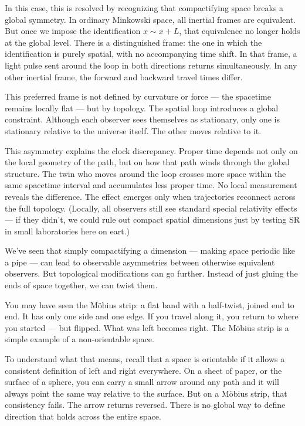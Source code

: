 In this case, this is resolved by recognizing that compactifying space breaks a global symmetry. In ordinary Minkowski space, all inertial frames are equivalent. But once we impose the identification $x \sim x + L$, that equivalence no longer holds at the global level. There is a distinguished frame: the one in which the identification is purely spatial, with no accompanying time shift. In that frame, a light pulse sent around the loop in both directions returns simultaneously. In any other inertial frame, the forward and backward travel times differ.

This preferred frame is not defined by curvature or force — the spacetime remains locally flat — but by topology. The spatial loop introduces a global constraint. Although each observer sees themselves as stationary, only one is stationary relative to the universe itself. The other moves relative to it.

This asymmetry explains the clock discrepancy. Proper time depends not only on the local geometry of the path, but on how that path winds through the global structure. The twin who moves around the loop crosses more space within the same spacetime interval and accumulates less proper time. No local measurement reveals the difference. The effect emerges only when trajectories reconnect across the full topology. (Locally, all observers still see standard special relativity effects — if they didn't, we could rule out compact spatial dimensions just by testing SR in small laboratories here on eart.)

We've seen that simply compactifying a dimension — making space periodic like a pipe — can lead to observable asymmetries between otherwise equivalent observers. But topological modifications can go further. Instead of just gluing the ends of space together, we can twist them.

You may have seen the Möbius strip: a flat band with a half-twist, joined end to end. It has only one side and one edge. If you travel along it, you return to where you started — but flipped. What was left becomes right. The Möbius strip is a simple example of a non-orientable space.

To understand what that means, recall that a space is orientable if it allows a consistent definition of left and right everywhere. On a sheet of paper, or the surface of a sphere, you can carry a small arrow around any path and it will always point the same way relative to the surface. But on a Möbius strip, that consistency fails. The arrow returns reversed. There is no global way to define direction that holds across the entire space.


